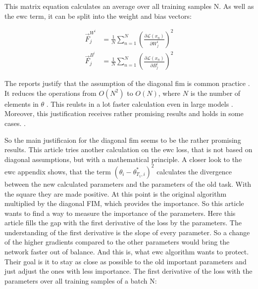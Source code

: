 This matrix equation calculates an average over all training samples N.
As well as the \acrshort{ewc} term, it can be split into the weight and bias vectors:

\begin{equation}
    \begin{split}
        \vec{F}^{W^i}_j & = 
        \frac{1}{N} 
        \sum_{n=1}^{N} 
        \left(
            \frac{\partial \mathcal{L} \left( x_n \right) }{\partial W^i_{j}}
        \right)^2
        \\
        \vec{F}^{B^i}_j & = 
        \frac{1}{N} 
        \sum_{n=1}^{N} 
        \left(
            \frac{\partial \mathcal{L} \left( x_n \right) }{\partial B^i_{j}}
        \right)^2
    \end{split}
\end{equation}

The reports \cite{better-weight-consolidation,elastic-weight-consolidation} justify that the assumption of the diagonal \acrshort{fim} is common practice \cite{elastic-weight-consolidation,better-weight-consolidation,incremental-moment-matching}.
It reduces the operations from $O(N^2)$ to $O(N)$, where $N$ is the number of elements in $\theta$ \cite{elastic-weight-consolidation,better-weight-consolidation}.
This reulsts in a lot faster calculation even in large models \cite{elastic-weight-consolidation,better-weight-consolidation}.
Moreover, this justification receives rather promising results and holds in some cases.
\cite{elastic-weight-consolidation,incremental-moment-matching}.

So the main justificaion for the diagonal \acrshort{fim} seems to be the rather promising results.
\newline
This article tries another calculation on the \acrshort{ewc} loss, that is not based on diagonal assumptions, but with a mathematical principle.
\newline
A closer look to the \acrshort{ewc} appendix shows, that the term $(\theta_i - \theta^*_{T_1,i})^2$ calculates the divergence between the new calculated parameters and the parameters of the old task.
With the square they are made positive.
At this point is the original algorithm multiplied by the diagonal FIM, which provides the importance.
So this article wants to find a way to measure the importance of the parameters.
Here this article fills the gap with the first derivative of the loss by the parameters.
The understanding of the first derivative is the slope of every parameter.
So a change of the higher gradients compared to the other parameters would bring the network faster out of balance.
And this is, what \acrshort{ewc} algorithm wants to protect. Their goal is it to stay as close as possible to the old important parameters and just adjust the ones with less importance.
The first derivative of the loss with the parameters over all training samples of a batch N:

